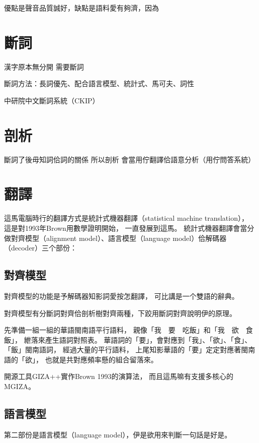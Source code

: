 優點是聲音品質誠好，缺點是語料愛有夠濟，因為







\section{斷詞}
\label{節：斷詞}
漢字原本無分開
需要斷詞

斷詞方法：長詞優先、配合語言模型、統計式、馬可夫、詞性

中研院中文斷詞系統（CKIP）\cite{CKIP論文}

\section{剖析}
\label{節：剖析}
斷詞了後毋知詞佮詞的關係
所以剖析
會當用佇翻譯佮語意分析（用佇問答系統）

\section{翻譯}
\label{節：翻譯}
這馬電腦時行的翻譯方式是統計式機器翻譯（statistical machine translation），
這是對1993年Brown用數學證明\cite{brown1993mathematics}開始，
一直發展到這馬。
統計式機器翻譯會當分做對齊模型（alignment model）、語言模型（language model）佮解碼器（decoder）三个部份：

\subsection{對齊模型}
\label{小節：對齊模型}
對齊模型的功能是予解碼器知影詞愛按怎翻譯，
可比講是一个雙語的辭典。

對齊模型有分斷詞對齊佮剖析樹對齊兩種，下跤用斷詞對齊說明伊的原理。

先準備一組一組的華語閩南語平行語料，
親像「我　要　吃飯」和「我　欲　食　飯」，
紲落來產生語詞對照表。
華語詞的「要」，會對應到「我」、「欲」、「食」、「飯」閩南語詞，
經過大量的平行語料，
上尾知影華語的「要」定定對應著閩南語的「欲」，
也就是共對應頻率懸的組合留落來。

開源工具GIZA++\cite{och2003systematic}實作Brown 1993的演算法，
而且這馬嘛有支援多核心的MGIZA\cite{gao2008parallel}。

\subsection{語言模型}
\label{小節：語言模型}
第二部份是語言模型（language model），伊是欲用來判斷一句話是好是。

